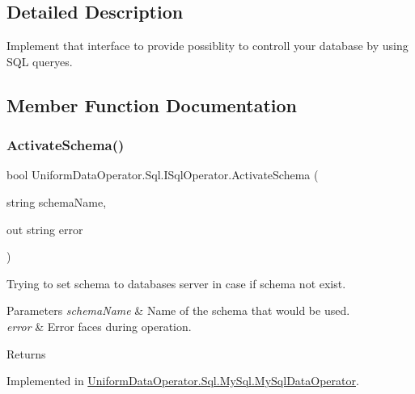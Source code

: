 \subsection{Detailed Description}
Implement that interface to provide possiblity to controll your database by using S\+QL queryes. 



\subsection{Member Function Documentation}
\mbox{\label{interface_uniform_data_operator_1_1_sql_1_1_i_sql_operator_a5ae8328a464ef80f1ae1bd46a573c265}} 
\subsubsection{\texorpdfstring{Activate\+Schema()}{ActivateSchema()}}
{\footnotesize\ttfamily bool Uniform\+Data\+Operator.\+Sql.\+I\+Sql\+Operator.\+Activate\+Schema (\begin{DoxyParamCaption}\item[{string}]{schema\+Name,  }\item[{out string}]{error }\end{DoxyParamCaption})}



Trying to set schema to databases server in case if schema not exist. 


\begin{DoxyParams}{Parameters}
{\em schema\+Name} & Name of the schema that would be used.\\
\hline
{\em error} & Error faces during operation.\\
\hline
\end{DoxyParams}
\begin{DoxyReturn}{Returns}

\end{DoxyReturn}


Implemented in \mbox{\hyperlink{class_uniform_data_operator_1_1_sql_1_1_my_sql_1_1_my_sql_data_operator_a2ed7d06bc016ae6d07cbcceffc21bbd3}{Uniform\+Data\+Operator.\+Sql.\+My\+Sql.\+My\+Sql\+Data\+Operator}}.

